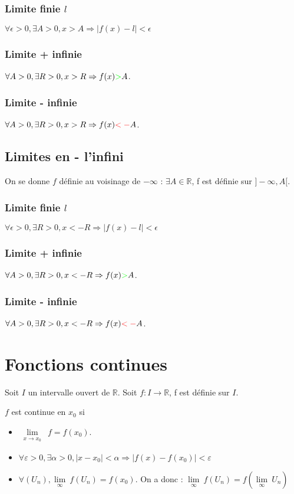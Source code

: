 \documentclass[french]{yLectureNote}
\newcommand{\Lim}[1]{\lim\limits_{\substack{#1}}\:}
\begin{document}
\subsubsection{Limite finie $l$}
$\forall \epsilon >0, \exists A>0, x>A \Rightarrow |f(x)-l|<\epsilon$
\begin{multicols}{2}
\subsubsection{Limite {\color{green}+} infinie}
$\forall A>0, \exists R>0, x>R \Rightarrow f(x){\color{green}>}A$.

\columnbreak
\subsubsection{Limite {\color{red}-} infinie}
$\forall A>0, \exists R>0, x>R \Rightarrow f(x){\color{red}<-}A$.
\end{multicols}

\subsection{Limites en - l'infini}
On se donne $f$ définie au voisinage de $-\infty$ : $\exists A\in\mathbb{R}$, f est définie sur $]-\infty,A[$.
\subsubsection{Limite finie $l$}
$\forall \epsilon >0, \exists R>0, x<-R \Rightarrow |f(x)-l|<\epsilon$
\newpage
\begin{multicols}{2}
\subsubsection{Limite {\color{green}+} infinie}
$\forall A>0, \exists R>0, x<-R \Rightarrow f(x){\color{green}>}A$.
\columnbreak
\subsubsection{Limite {\color{red}-} infinie}
$\forall A>0, \exists R>0, x<-R \Rightarrow f(x){\color{red}<-}A$.
\end{multicols}



\section{Fonctions continues}
Soit $I$ un intervalle ouvert de $\mathbb{R}$. Soit $f:I\to \mathbb{R}$, f est définie sur $I$.
\begin{theorem}[Définitions]
$f$ est continue en $x_0$ si
\begin{itemize}
 \item $\Lim{x\to x_0} f = f(x_0)$.
 \item $\forall \varepsilon >0,\exists  \alpha >0, |x-x_0|<\alpha \Rightarrow |f(x)-f(x_0)|<\varepsilon$
 \item $\forall (U_n), \Lim{\infty}f(U_n) = f(x_0)$. On a donc : $\Lim{\infty} f(U_n) = f(\Lim{\infty} U_n)$
\end{itemize}
\end{theorem}
\end{document}
